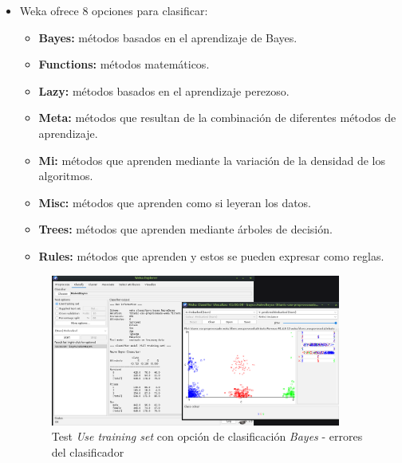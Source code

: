 \documentclass[12pt]{article}
\begin{document}
\begin{itemize}
                    \item Weka ofrece 8 opciones para clasificar:
                        \begin{itemize}
                            \item \textbf{Bayes:} métodos basados en el aprendizaje de Bayes.
                            \item \textbf{Functions:} métodos matemáticos.
                            \item \textbf{Lazy:} métodos basados en el aprendizaje perezoso.
                            \item \textbf{Meta:} métodos que resultan de la combinación de diferentes métodos de aprendizaje.
                            \item \textbf{Mi:} métodos que aprenden mediante la variación de la densidad de los algoritmos.
                            \item \textbf{Misc:} métodos que aprenden como si leyeran los datos.
                            \item \textbf{Trees:} métodos que aprenden mediante árboles de decisión.
                            \item \textbf{Rules:} métodos que aprenden y estos se pueden expresar como reglas.
                        \end{itemize}

                        \begin{figure}[!h]
                            \centering
                            \includegraphics[width=0.9\textwidth]{img/weka-8.png}
                            \caption{Test \textit{Use training set} con opción de clasificación \textit{Bayes} - errores del clasificador}
                        \end{figure}


\end{itemize}
\end{document}
